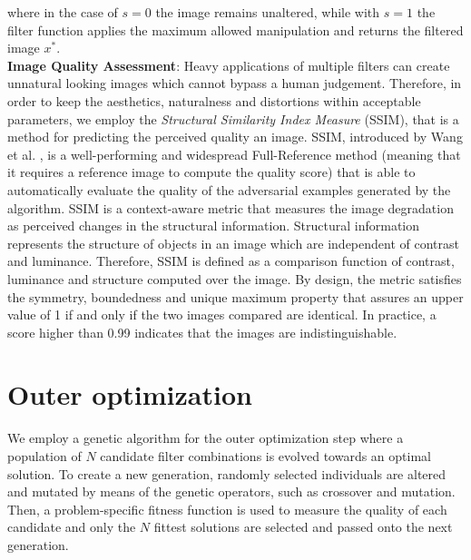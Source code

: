 where in the case of $s=0$ the image remains unaltered, while with $s=1$ the filter function applies the maximum allowed manipulation and returns the filtered image $x^*$.\\

\noindent \textbf{Image Quality Assessment}: Heavy applications of multiple filters can create unnatural looking images which cannot bypass a human judgement. Therefore, in order to keep the aesthetics, naturalness and distortions within acceptable parameters, we employ the \textit{Structural Similarity Index Measure} (SSIM), that is a method for predicting the perceived quality an image. SSIM, introduced by Wang et al. \cite{SSIM}, is a well-performing and widespread Full-Reference method (meaning that it requires a reference image to compute the quality score) that is able to automatically evaluate the quality of the adversarial examples generated by the algorithm. SSIM is a context-aware metric that measures the image degradation as perceived changes in the structural information. Structural information represents the structure of objects in an image which are independent of contrast and luminance. Therefore, SSIM is defined as a comparison function of contrast, luminance and structure computed over the image. By design, the metric satisfies the symmetry, boundedness and unique maximum property that assures an upper value of 1 if and only if the two images compared are identical. In practice, a score higher than 0.99 indicates that the images are indistinguishable. 



\section{Outer optimization}
We employ a genetic algorithm for the outer optimization step where a population of $N$ candidate filter combinations is evolved towards an optimal solution.
To create a new generation, randomly selected individuals are altered and mutated by means of the genetic operators, such as crossover and mutation. Then, a problem-specific fitness function is used to measure the quality of each candidate and only the $N$ fittest solutions are selected and passed onto the next generation.

